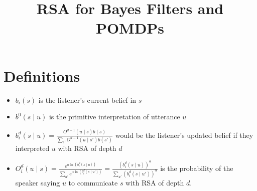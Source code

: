 \documentclass[12pt,fleqn,leqno,letterpaper]{article}
\title{RSA for Bayes Filters and POMDPs}
\newcommand\listener[4]{\ddfrac{O^{{#3}-1}({#2} \mid {#1})b({#1})}{\sum_{s'}O^{{#3}-1}({#2} \mid s')b(s')}}
\newcommand\speakerexp[4]{\ddfrac{e^{\alpha \ln(b_{#4}^{#3}({#1} \mid {#2}))}}{\sum_{u'}e^{\alpha \ln(b_{#4}^{#3}({#1} \mid u'))}}}
\newcommand\speaker[4]{\ddfrac{\left(b_{#4}^{#3}({#1} \mid {#2})\right)^{\alpha}}{\sum_{u'}\left(b_{#4}^{#3}({#1} \mid u')\right)^{\alpha}}}
\def\ddfrac#1#2{\displaystyle\frac{\displaystyle #1}{\displaystyle #2}}
\begin{document}
\maketitle

\section{Definitions}
\begin{itemize}
    \item $b_i(s)$ is the listener's current belief in $s$
    \item $b^0(s \mid u)$ is the primitive interpretation of utterance $u$
    \item $b_i^d(s \mid u) = \listener{s}{u}{d}{i}$ would be the listener's updated belief if they interpreted $u$ with RSA of depth $d$
    \item $O_i^d(u \mid s) = \speakerexp{s}{u}{d}{i} = \speaker{s}{u}{d}{i}$ is the probability of the speaker saying $u$ to communicate $s$ with RSA of depth $d$.
\end{itemize}
\end{document}
